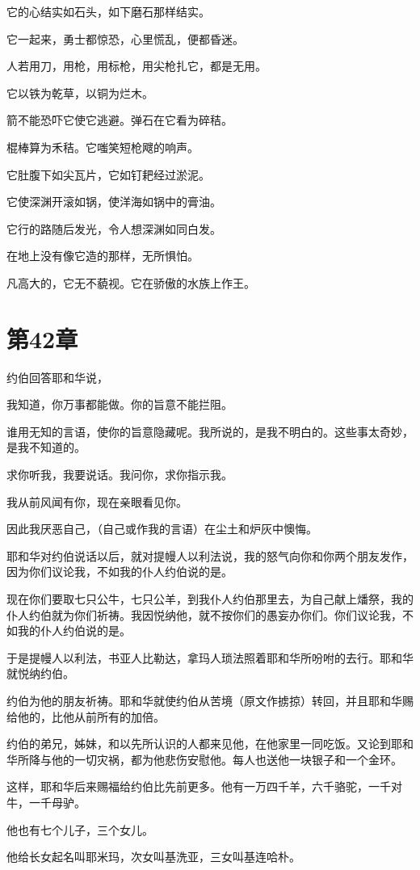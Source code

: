 \documentclass[12pt,oneside]{book}
\begin{document}
它的心结实如石头，如下磨石那样结实。

它一起来，勇士都惊恐，心里慌乱，便都昏迷。

人若用刀，用枪，用标枪，用尖枪扎它，都是无用。

它以铁为乾草，以铜为烂木。

箭不能恐吓它使它逃避。弹石在它看为碎秸。

棍棒算为禾秸。它嗤笑短枪飕的响声。

它肚腹下如尖瓦片，它如钉耙经过淤泥。

它使深渊开滚如锅，使洋海如锅中的膏油。

它行的路随后发光，令人想深渊如同白发。

在地上没有像它造的那样，无所惧怕。

凡高大的，它无不藐视。它在骄傲的水族上作王。


\chapter{第42章}
约伯回答耶和华说，

我知道，你万事都能做。你的旨意不能拦阻。

谁用无知的言语，使你的旨意隐藏呢。我所说的，是我不明白的。这些事太奇妙，是我不知道的。

求你听我，我要说话。我问你，求你指示我。

我从前风闻有你，现在亲眼看见你。

因此我厌恶自己，（自己或作我的言语）在尘土和炉灰中懊悔。

耶和华对约伯说话以后，就对提幔人以利法说，我的怒气向你和你两个朋友发作，因为你们议论我，不如我的仆人约伯说的是。

现在你们要取七只公牛，七只公羊，到我仆人约伯那里去，为自己献上燔祭，我的仆人约伯就为你们祈祷。我因悦纳他，就不按你们的愚妄办你们。你们议论我，不如我的仆人约伯说的是。

于是提幔人以利法，书亚人比勒达，拿玛人琐法照着耶和华所吩咐的去行。耶和华就悦纳约伯。

约伯为他的朋友祈祷。耶和华就使约伯从苦境（原文作掳掠）转回，并且耶和华赐给他的，比他从前所有的加倍。

约伯的弟兄，姊妹，和以先所认识的人都来见他，在他家里一同吃饭。又论到耶和华所降与他的一切灾祸，都为他悲伤安慰他。每人也送他一块银子和一个金环。

这样，耶和华后来赐福给约伯比先前更多。他有一万四千羊，六千骆驼，一千对牛，一千母驴。

他也有七个儿子，三个女儿。

他给长女起名叫耶米玛，次女叫基洗亚，三女叫基连哈朴。
\end{document}
